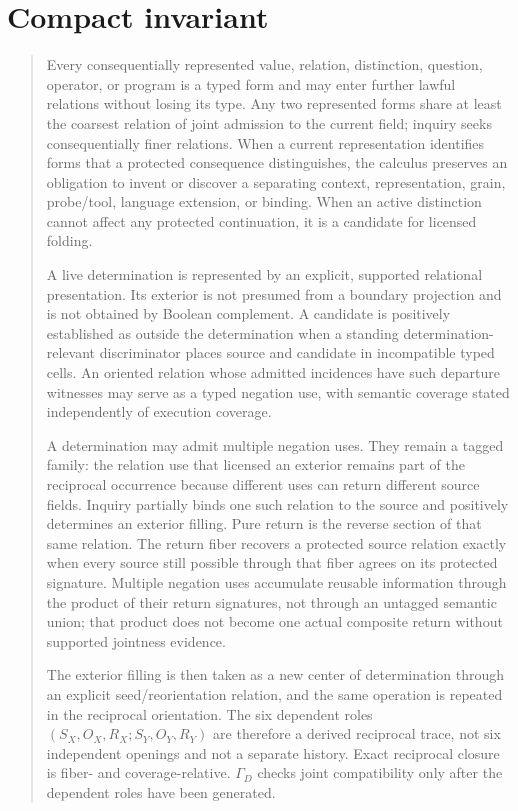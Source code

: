\documentclass[11pt,oneside]{article}
\begin{document}
\section{Compact invariant}

\begin{quote}
\small
Every consequentially represented value, relation, distinction, question, operator, or program is a typed form and may enter further lawful relations without losing its type.  Any two represented forms share at least the coarsest relation of joint admission to the current field; inquiry seeks consequentially finer relations.  When a current representation identifies forms that a protected consequence distinguishes, the calculus preserves an obligation to invent or discover a separating context, representation, grain, probe/tool, language extension, or binding.  When an active distinction cannot affect any protected continuation, it is a candidate for licensed folding.

A live determination is represented by an explicit, supported relational presentation.  Its exterior is not presumed from a boundary projection and is not obtained by Boolean complement.  A candidate is positively established as outside the determination when a standing determination-relevant discriminator places source and candidate in incompatible typed cells.  An oriented relation whose admitted incidences have such departure witnesses may serve as a typed negation use, with semantic coverage stated independently of execution coverage.

A determination may admit multiple negation uses.  They remain a tagged family: the relation use that licensed an exterior remains part of the reciprocal occurrence because different uses can return different source fields.  Inquiry partially binds one such relation to the source and positively determines an exterior filling.  Pure return is the reverse section of that same relation.  The return fiber recovers a protected source relation exactly when every source still possible through that fiber agrees on its protected signature.  Multiple negation uses accumulate reusable information through the product of their return signatures, not through an untagged semantic union; that product does not become one actual composite return without supported jointness evidence.

The exterior filling is then taken as a new center of determination through an explicit seed/reorientation relation, and the same operation is repeated in the reciprocal orientation.  The six dependent roles \((S_X,O_X,R_X;S_Y,O_Y,R_Y)\) are therefore a derived reciprocal trace, not six independent openings and not a separate history.  Exact reciprocal closure is fiber- and coverage-relative.  \(\Gamma_D\) checks joint compatibility only after the dependent roles have been generated.


\end{quote}
\end{document}
